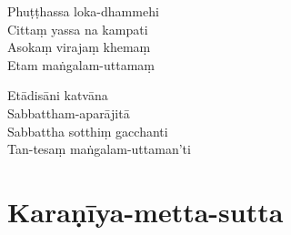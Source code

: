 \begin{paritta}
Phuṭṭhassa loka-dhammehi\\
Cittaṃ yassa na kampati\\
Asokaṃ virajaṃ khemaṃ\\
Etam maṅgalam-uttamaṃ

Etādisāni katvāna\\
Sabbattham-aparājitā\\
Sabbattha sotthiṃ gacchanti\\
Tan-tesaṃ maṅgalam-uttaman'ti


\end{paritta}

\clearpage

\chapter{Karaṇīya-metta-sutta}%


